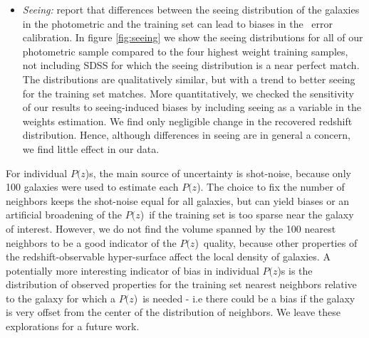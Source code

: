 \documentclass[12pt,preprint]{aastex}
\newcommand{\pofz}{$P(z$)}
\begin{document}
\begin{itemize}
\item {\it Seeing: } \citet{Nakajima11} report that differences
between the seeing distribution of the galaxies in the photometric and the
training set can lead to biases in the \photoz\ error calibration.  In figure
\ref{fig:seeing} we show the seeing distributions for all of our photometric
sample compared to the four highest weight training samples, not including SDSS
for which the seeing distribution is a near perfect match.  The distributions
are qualitatively similar, but with a trend to better seeing for the training
set matches.  More quantitatively, we checked the sensitivity of our results to
seeing-induced biases by including seeing as a variable in the weights
estimation.  We find only negligible change in the recovered redshift
distribution.  Hence, although differences in seeing are in general a concern, we
find little effect in our data.
\end{itemize}

For individual \pofz s, the main source of uncertainty is shot-noise, because
only 100 galaxies were used to estimate each \pofz.  The choice to fix the
number of neighbors keeps the shot-noise equal for all galaxies, but can 
yield biases or an artificial broadening of the \pofz\ if the training set is
too sparse near the galaxy of interest.  However, we do not find the volume
spanned by the 100 nearest neighbors to be a good indicator of the \pofz\
quality, because other properties of the redshift-observable
hyper-surface affect the local density of galaxies.  A potentially more
interesting indicator of bias in individual \pofz s is the distribution of
observed properties for the training set nearest neighbors relative to the
galaxy for which a \pofz\ is needed - i.e there could be a bias if the galaxy
is very offset from the center of the distribution of neighbors. We leave these
explorations for a future work.
\end{document}
